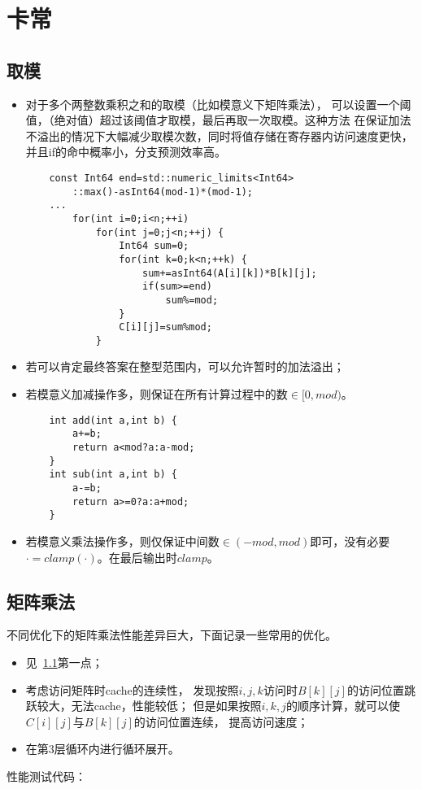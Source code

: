 \section{卡常}
\subsection{取模}\label{mod}
\begin{itemize}
    \item 对于多个两整数乘积之和的取模（比如模意义下矩阵乘法），
    可以设置一个阈值，（绝对值）超过该阈值才取模，最后再取一次取模。这种方法
    在保证加法不溢出的情况下大幅减少取模次数，同时将值存储在寄存器内访问速度更快，
    并且if的命中概率小，分支预测效率高。
    \begin{lstlisting}
    const Int64 end=std::numeric_limits<Int64>
        ::max()-asInt64(mod-1)*(mod-1);
    ...
        for(int i=0;i<n;++i)
            for(int j=0;j<n;++j) {
                Int64 sum=0;
                for(int k=0;k<n;++k) {
                    sum+=asInt64(A[i][k])*B[k][j];
                    if(sum>=end)
                        sum%=mod;
                }
                C[i][j]=sum%mod;
            }
    \end{lstlisting}
    \item 若可以肯定最终答案在整型范围内，可以允许暂时的加法溢出；
    \item 若模意义加减操作多，则保证在所有计算过程中的数$\in[0,mod)$。
    \begin{lstlisting}
    int add(int a,int b) {
        a+=b;
        return a<mod?a:a-mod;
    }
    int sub(int a,int b) {
        a-=b;
        return a>=0?a:a+mod;
    }
    \end{lstlisting}
    \item 若模意义乘法操作多，则仅保证中间数$\in (-mod,mod)$即可，没有必要
    $\cdot =clamp(\cdot)$。在最后输出时$clamp$。
\end{itemize}
\subsection{矩阵乘法}
不同优化下的矩阵乘法性能差异巨大，下面记录一些常用的优化。
\begin{itemize}
    \item 见~\ref{mod}第一点；
    \item 考虑访问矩阵时cache的连续性，
    发现按照$i,j,k$访问时$B[k][j]$的访问位置跳跃较大，无法cache，性能较低；
    但是如果按照$i,k,j$的顺序计算，就可以使$C[i][j]$与$B[k][j]$的访问位置连续，
    提高访问速度；
    \item 在第3层循环内进行循环展开。
\end{itemize}
性能测试代码：


